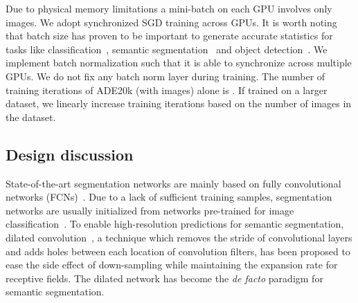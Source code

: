 \documentclass[runningheads]{llncs}
\begin{document}
Due to physical memory limitations a mini-batch on each GPU involves only  images. We adopt synchronized SGD training across  GPUs. It is worth noting that batch size has proven to be important to generate accurate statistics for tasks like classification~\cite{ioffe2017batch}, semantic segmentation~\cite{zhao2017pyramid} and object detection~\cite{peng2017megdet}. We implement batch normalization such that it is able to synchronize across multiple GPUs. We do not fix any batch norm layer during training. The number of training iterations of ADE20k (with  images) alone is . If trained on a larger dataset, we linearly increase training iterations based on the number of images in the dataset.

\subsection{Design discussion}
State-of-the-art segmentation networks are mainly based on fully convolutional networks (FCNs)~\cite{long2015fully}. Due to a lack of sufficient training samples, segmentation networks are usually initialized from networks pre-trained for image classification~\cite{deng2009imagenet,krizhevsky2012imagenet,simonyan2014very}. To enable high-resolution predictions for semantic segmentation, dilated convolution~\cite{yu2015multi}, a technique which removes the stride of convolutional layers and adds holes between each location of convolution filters, has been proposed to ease the side effect of down-sampling while maintaining the expansion rate for receptive fields. The dilated network has become the \textit{de facto} paradigm for semantic segmentation.
\end{document}
